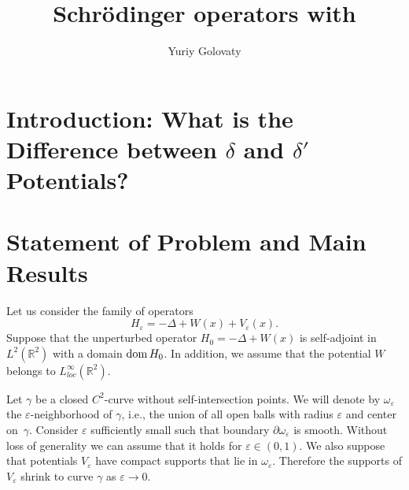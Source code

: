 \documentclass[graybox]{svmult}
\newcommand{\dom}{\mathop{\rm dom}}
\newcommand{\Real}{\mathbb R}
\newcommand{\eps}{\varepsilon}
\begin{document}
\title*{Schr\"{o}dinger operators with}
\author{Yuriy Golovaty}

\maketitle



\section{Introduction: What is the Difference between $\delta$ and $\delta'$ Potentials?    }
\label{Sec:Introduction}


\section{Statement of Problem and Main Results}
\label{Sec:Statment}

Let us consider the family of operators
\begin{equation}\label{OprHe}
H_\eps=-\Delta +W(x)+V_\eps(x).
\end{equation}
Suppose that the unperturbed operator $H_0=-\Delta +W(x)$ is self-adjoint in $L^2(\Real^2)$ with a domain $\dom H_0$. In addition, we assume that the potential $W$ belongs to $L^\infty_{loc}(\Real^2)$.

Let $\gamma$ be a  closed $C^2$-curve without self-intersection
points. We will denote by $\omega_\eps$ the $\eps$-neighborhood of $\gamma$, i.e., the union of all open balls with radius $\eps$ and center on~$\gamma$. Consider $\eps$ sufficiently small such that boundary
$\partial\omega_\eps$ is smooth. Without loss of generality we can assume that it holds for $\eps\in (0,1)$. We also suppose that potentials $V_\eps$ have compact supports that lie in $\omega_\eps$. Therefore the supports of $V_\eps$ shrink to curve $\gamma$ as $\eps\to 0$.
\end{document}
